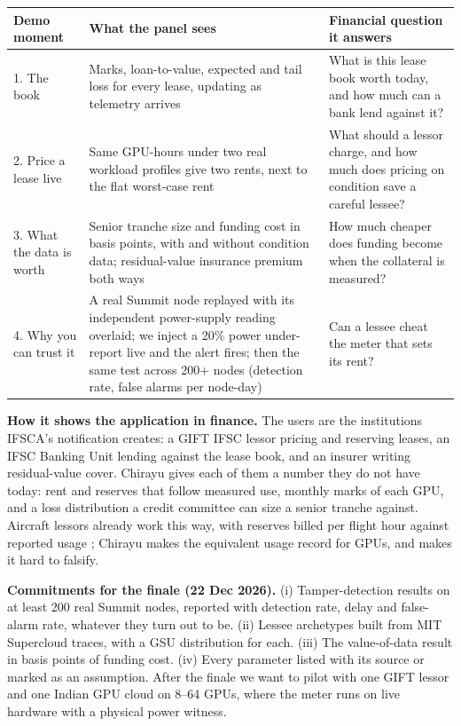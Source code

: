 \documentclass[10pt]{article}
\begin{document}
\begin{table}[h]
\centering\small
\begin{tabularx}{\linewidth}{@{}p{3.1cm}X X@{}}
\toprule
Demo moment & What the panel sees & Financial question it answers \\
\midrule
1. The book & Marks, loan-to-value, expected and tail loss for every lease, updating as telemetry arrives & What is this lease book worth today, and how much can a bank lend against it? \\
2. Price a lease live & Same GPU-hours under two real workload profiles give two rents, next to the flat worst-case rent & What should a lessor charge, and how much does pricing on condition save a careful lessee? \\
3. What the data is worth & Senior tranche size and funding cost in basis points, with and without condition data; residual-value insurance premium both ways & How much cheaper does funding become when the collateral is measured? \\
4. Why you can trust it & A real Summit node replayed with its independent power-supply reading overlaid; we inject a 20\% power under-report live and the alert fires; then the same test across 200+ nodes (detection rate, false alarms per node-day) & Can a lessee cheat the meter that sets its rent? \\
\bottomrule
\end{tabularx}
\end{table}

\textbf{How it shows the application in finance.} The users are the institutions IFSCA's notification creates: a GIFT IFSC lessor pricing and reserving leases, an IFSC Banking Unit lending against the lease book, and an insurer writing residual-value cover. Chirayu gives each of them a number they do not have today: rent and reserves that follow measured use, monthly marks of each GPU, and a loss distribution a credit committee can size a senior tranche against. Aircraft lessors already work this way, with reserves billed per flight hour against reported usage \cite{aircraft}; Chirayu makes the equivalent usage record for GPUs, and makes it hard to falsify.

\textbf{Commitments for the finale (22 Dec 2026).} (i) Tamper-detection results on at least 200 real Summit nodes, reported with detection rate, delay and false-alarm rate, whatever they turn out to be. (ii) Lessee archetypes built from MIT Supercloud traces, with a GSU distribution for each. (iii) The value-of-data result in basis points of funding cost. (iv) Every parameter listed with its source or marked as an assumption. After the finale we want to pilot with one GIFT lessor and one Indian GPU cloud on 8--64 GPUs, where the meter runs on live hardware with a physical power witness.
\end{document}
